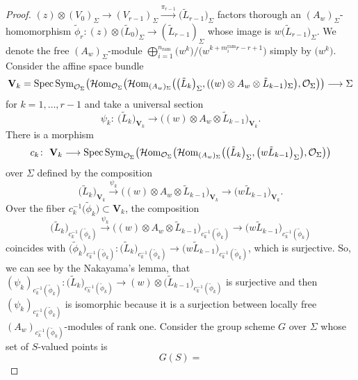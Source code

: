 \documentclass[pdftex]{sigma}
\numberwithin{equation}{section}
\newcommand\Spec{\mathop{\rm Spec}\nolimits}
\begin{document}
\begin{proof}
$(z)\otimes (V_0)_{\Sigma}\longrightarrow (V_{r-1})_{\Sigma}
\xrightarrow{\pi_{r-1}} \big(\tilde{L}_{r-1}\big)_{\Sigma}$
factors thorough an $(A_w)_{\Sigma}$-homomorphism
$\tilde{\phi}_r\colon (z)\otimes \big(\tilde{L}_0\big)_{\Sigma}\longrightarrow (\tilde{L}_{r-1})_{\Sigma}$
whose image is $w\big(\tilde{L}_{r-1}\big)_{\Sigma}$.
We denote the free $(A_w)_{\Sigma}$-module
$\bigoplus_{i=1}^{n_{\mathrm{ram}}}\big(w^k\big)/\big(w^{k+m_i^{\mathrm{ram}}r-r+1}\big)$ simply by $\big(w^k\big)$.
Consider the affine space bundle
\[
 \mathbf{V}_k=
 \Spec \mathrm{Sym}_{{\mathcal O}_{\Sigma}}
\big({\mathcal H}{\rm om}_{{\mathcal O}_{\Sigma}}
\big({\mathcal H}{\rm om}_{(A_w)_{\Sigma}} \big(
 \big(\tilde{L}_k\big)_{\Sigma} , ((w)\otimes A_w \otimes \tilde{L}_{k-1})_{\Sigma} \big) ,
 {\mathcal O}_{\Sigma}
\big) \big)
 \longrightarrow {\Sigma}
\]
for $k=1,\dots,r-1$ and take a universal section
\[
 \psi_k\colon \
 \big(\tilde{L}_k\big)_{\mathbf{V}_k}\longrightarrow \big((w)\otimes A_w\otimes \tilde{L}_{k-1}\big)_{\mathbf{V}_k}.
\]
There is a morphism
\[
 c_k\colon \
 \mathbf{V}_k \longrightarrow
 \Spec \mathrm{Sym}_{{\mathcal O}_{\Sigma}}
\big({\mathcal H}{\rm om}_{{\mathcal O}_{\Sigma}}
\big({\mathcal H}{\rm om}_{(A_w)_{\Sigma}} \big( \big(\tilde{L}_k\big)_{\Sigma}, \big(w \tilde{L}_{k-1}\big)_{\Sigma}\big) ,
 {\mathcal O}_{\Sigma}
\big) \big)
\]
over $\Sigma$ defined by the composition
\[
 \big(\tilde{L}_k\big)_{\mathbf{V}_k} \xrightarrow{\psi_k}
 \big((w)\otimes A_w\otimes \tilde{L}_{k-1}\big)_{\mathbf{V}_k}
 \longrightarrow
 \big(w\tilde{L}_{k-1}\big)_{\mathbf{V}_k}.
\]
Over the fiber
$c_k^{-1}\big(\tilde{\phi}_k\big)\subset \mathbf{V}_k$,
the composition
\[
 \big(\tilde{L}_k\big)_{c_k^{-1}(\tilde{\phi}_k)} \xrightarrow{\psi_k}
 \big((w)\otimes A_w\otimes \tilde{L}_{k-1}\big)_{c_k^{-1}(\tilde{\phi}_k)}
 \longrightarrow
 \big(w\tilde{L}_{k-1}\big)_{c_k^{-1}(\tilde{\phi}_k)}
\]
coincides with
$\big(\tilde{\phi}_k\big)_{c_k^{-1}(\tilde{\phi}_k)}\colon
\big(\tilde{L}_k\big)_{c_k^{-1}(\tilde{\phi}_k)}
\longrightarrow
\big(w\tilde{L}_{k-1}\big)_{c_k^{-1}(\tilde{\phi}_k)}$,
which is surjective.
So, we can see by the Nakayama's lemma, that
$(\psi_k)_{c_k^{-1}(\tilde{\phi}_k)} \colon
\big(\tilde{L}_k\big)_{c_k^{-1}(\tilde{\phi}_k)} \longrightarrow
(w) \otimes \big(\tilde{L}_{k-1}\big)_{c_k^{-1}(\tilde{\phi}_k)}$
is surjective and then $(\psi_k)_{c_k^{-1}(\tilde{\phi}_k)} $ is isomorphic
because it is a surjection between locally free $(A_w)_{c_k^{-1}(\tilde{\phi}_k)}$-modules
of rank one.
Consider the group scheme $G$ over $\Sigma$
whose set of $S$-valued points is
\[
 G(S)=
\]
\end{proof}
\end{document}
